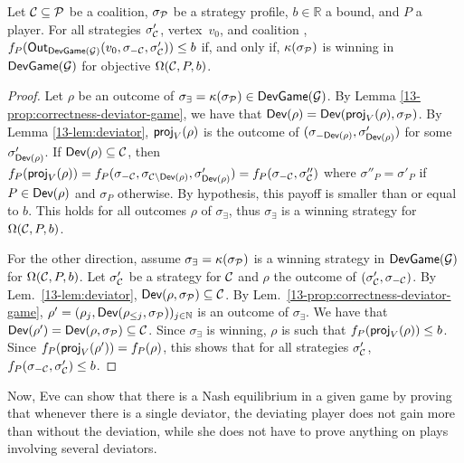 \begin{lemma} \label{13-lem:omegaCAg}
  Let \(\mathcal{C} \subseteq \mathcal{P}\) be a coalition,
  \(\sigma_{\mathcal{P}}\) be a strategy profile, \(b \in \mathbb{R}\) a bound,
  and \(P\) a player. For all strategies \(\sigma'_{\mathcal{C}}\), vertex~$v_0$,
  and coalition \Coalition, \(f_P(\textsf{Out}_{\textsf{DevGame}(\mathcal{G})}(v_0, \sigma_{-\mathcal{C}}, \sigma'_{\mathcal{C}})) \le b\) if, and
  only if, \(\kappa(\sigma_{\mathcal{P}})\) is winning in \(\textsf{DevGame}(\mathcal{G})\) for objective
  \(\Omega(\mathcal{C}, P, b)\).
\end{lemma}
\begin{proof} Let \(\rho\) be an outcome of
  \(\sigma_\exists=\kappa(\sigma_{\mathcal{P}}) \in \textsf{DevGame}(\mathcal{G})\). By Lemma
  \ref{13-prop:correctness-deviator-game}, we have that
  \(\textsf{Dev}(\rho) = \textsf{Dev}(\textsf{proj}_V(\rho),\sigma_{\mathcal{P}})\). By Lemma
  \ref{13-lem:deviator}, \(\textsf{proj}_V(\rho)\) is the outcome of
  \((\sigma_{-\textsf{Dev}(\rho)},\sigma'_{\textsf{Dev}(\rho)})\) for some
  \(\sigma'_{\textsf{Dev}(\rho)}\). If \(\textsf{Dev}(\rho) \subseteq \mathcal{C}\), then
  \(f_P(\textsf{proj}_V(\rho)) = f_P(\sigma_{-\mathcal{C}},\sigma_{\mathcal{C}\setminus \textsf{Dev}(\rho)}, \sigma'_{\textsf{Dev}(\rho)}) = f_P(\sigma_{-\mathcal{C}},\sigma''_{\mathcal{C}})\)
  where \(\sigma''_P = \sigma'_P\) if \(P \in \textsf{Dev}(\rho)\) and \(\sigma_P\)
  otherwise. By hypothesis, this payoff is smaller than or equal to \(b\).
  This holds for
  all outcomes \(\rho\) of \(\sigma_\exists\), thus \(\sigma_\exists\) is
  a winning strategy for \(\Omega(\mathcal{C},P,b)\).

  For the other direction, assume \(\sigma_\exists = \kappa(\sigma_{\mathcal{P}})\)
  is a winning strategy in \(\textsf{DevGame}(\mathcal{G})\) for \(\Omega(\mathcal{C},P,b)\). Let
  \(\sigma'_{\mathcal{C}}\) be a strategy for \(\mathcal{C}\) and \(\rho\) the outcome of
  \((\sigma'_{\mathcal{C}},\sigma_{-{\mathcal{C}}})\). By
  Lem.~\ref{13-lem:deviator},
  \(\textsf{Dev}(\rho,\sigma_{\mathcal{P}}) \subseteq \mathcal{C}\). By
  Lem.~\ref{13-prop:correctness-deviator-game},
  \(\rho'= (\rho_j, \textsf{Dev}(\rho_{\le j},\sigma_{\mathcal{P}}))_{j\in \mathbb{N}}\) is
  an outcome of \(\sigma_\exists\). We have that
  \(\textsf{Dev}(\rho') = \textsf{Dev}(\rho,\sigma_{\mathcal{P}}) \subseteq \mathcal{C}\). Since
  \(\sigma_\exists\) is winning, \(\rho\) is such that
  \(f_P(\textsf{proj}_V(\rho)) \le b\). Since
  \(f_{P}(\textsf{proj}_V(\rho')) = f_{P}(\rho)\),
  this shows that for all strategies \(\sigma'_{\mathcal{C}}\),
  \(f_P(\sigma_{-\mathcal{C}},\sigma'_{\mathcal{C}}) \le b\).
\end{proof}

Now, Eve can show that there is a Nash equilibrium in a given game
by proving that whenever there is a single deviator,
the deviating player does not gain more than without the deviation,
while she does not have to prove anything on plays involving several
deviators.

